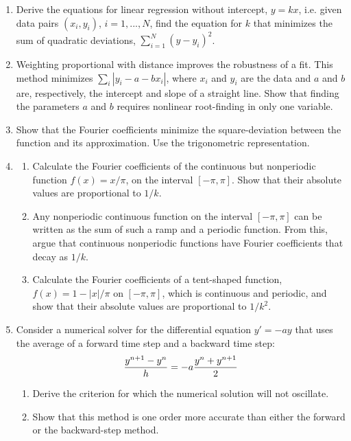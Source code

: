 \documentclass{article}
\begin{document}
\begin{enumerate}
\item
Derive the equations for linear regression without intercept, $y=k x$, i.e. given data pairs $(x_i,y_i)$, $i=1,...,N$, find the equation for $k$ that minimizes the sum of quadratic deviations, $\sum_{i=1}^N (y-y_i)^2$.

\item
Weighting proportional with distance improves the robustness of a fit.  This method minimizes $\sum_{i}|y_i -a-bx_i|$, where $x_i$ and $y_i$ are the data and $a$ and $b$ are, respectively, the intercept and slope of a straight line.  Show that finding the parameters $a$ and $b$ requires nonlinear root-finding in only one variable.


\item \label{prbl:fourier2min}
  Show that the Fourier coefficients minimize the square-deviation between the function and its approximation. Use the trigonometric representation.

  
\item \label{prbl:fourier}
\begin{enumerate}\setlength{\itemsep}{0pt}
\item Calculate the Fourier coefficients of the continuous but nonperiodic function $f(x)=x/\pi$, on the interval $[-\pi,\pi]$. Show that their absolute values are proportional to $1/k$.
\item Any nonperiodic continuous function on the interval $[-\pi,\pi]$ can be written as the sum of such a ramp and a periodic function. From this, argue that continuous nonperiodic functions have Fourier coefficients that decay as $1/k$.
\item Calculate the Fourier coefficients of a tent-shaped function, $f(x)=1-|x|/\pi$ on $[-\pi,\pi]$, which is continuous and periodic, and show that their absolute values are proportional to $1/k^{2}$.
\end{enumerate}


\item \label{prbl:odesemi}
  Consider a numerical solver for the differential equation $y'=-ay$ that uses the average of a forward time step and a backward time step:
\[
{ y^{n+1} - y^n \over h} = -a {y^n + y^{n+1} \over 2}
\]
\begin{enumerate} \setlength{\itemsep}{0pt}
\item Derive the criterion for which the numerical solution will not oscillate.
\item Show that this method is one order more accurate than either the forward or the backward-step method.
\end{enumerate}




\end{enumerate}
\end{document}
